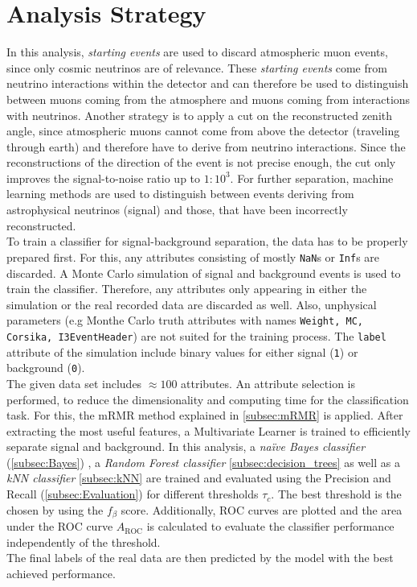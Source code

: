 \section{Analysis Strategy}
\label{sec:Strategy}
In this analysis, \textit{starting events} are used to discard atmospheric muon events, since only cosmic neutrinos are of relevance. These \textit{starting events} come from neutrino
interactions within the detector and can therefore be used to distinguish between muons coming from the atmosphere and muons coming from interactions with neutrinos. Another strategy is 
to apply a cut on the reconstructed zenith angle, since atmospheric muons cannot come from above the detector (traveling through earth) and therefore have to derive from neutrino interactions.
Since the reconstructions of the direction of the event is not precise enough, the cut only improves the signal-to-noise ratio up to $1:10^3$. For further separation, machine learning
methods are used to distinguish between events deriving from astrophysical neutrinos (signal) and those, that have been incorrectly reconstructed.\\
To train a classifier for signal-background separation, the data has to be properly prepared first. For this, any attributes consisting of mostly \texttt{NaN}s or \texttt{Inf}s are discarded.
A Monte Carlo simulation of signal and background events is used to train the classifier. Therefore, any attributes only appearing in either the simulation or the real recorded data are
discarded as well. Also, unphysical parameters (e.g Monthe Carlo truth attributes with names \texttt{Weight, MC, Corsika, I3EventHeader}) are not suited for the training process. The \texttt{label}
attribute of the simulation include binary values for either signal (\texttt{1}) or background (\texttt{0}).\\
The given data set includes $\approx 100$ attributes. An attribute selection is performed, to reduce the dimensionality and computing time for the classification task. For this, the mRMR method explained
in \autoref{subsec:mRMR} is applied. After extracting the most useful features, a Multivariate Learner is trained to efficiently separate signal and background. In this analysis, a \textit{na\"ive Bayes classifier} (\autoref{subsec:Bayes})
, a \textit{Random Forest classifier} \autoref{subsec:decision_trees} as well as a \textit{kNN classifier} \autoref{subsec:kNN} are trained and evaluated using the Precision and Recall (\autoref{subsec:Evaluation}) for different thresholds $\tau_c$. The best threshold is the chosen by 
using the $f_{\beta}$ score. Additionally, ROC curves are plotted and the area under the ROC curve $A_{\mathrm{ROC}}$ is calculated to evaluate the classifier performance independently of the threshold.\\
The final labels of the real data are then predicted by the model with the best achieved performance.
